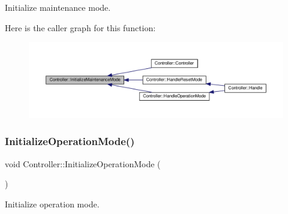 Initialize maintenance mode. 

Here is the caller graph for this function\+:
\nopagebreak
\begin{figure}[H]
\begin{center}
\leavevmode
\includegraphics[width=350pt]{classController_ae727ee9be8a2b2d0a966d1c14f85f360_icgraph}
\end{center}
\end{figure}
\mbox{\label{classController_a4f8fff93f7443154b80cd2d18316e32d}} 
\subsubsection{\texorpdfstring{Initialize\+Operation\+Mode()}{InitializeOperationMode()}}
{\footnotesize\ttfamily void Controller\+::\+Initialize\+Operation\+Mode (\begin{DoxyParamCaption}{ }\end{DoxyParamCaption})\hspace{0.3cm}{\ttfamily [private]}}



Initialize operation mode. 

